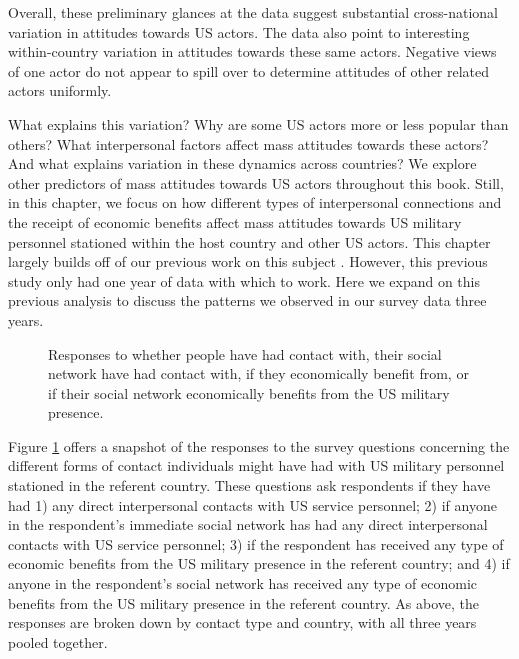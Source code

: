 Overall, these preliminary glances at the data suggest substantial cross-national variation in attitudes towards US actors. The data also point to interesting within-country variation in attitudes towards these same actors. Negative views of one actor do not appear to spill over to determine attitudes of other related actors uniformly. 


What explains this variation? Why are some US actors more or less popular than others? What interpersonal factors affect mass attitudes towards these actors? And what explains variation in these dynamics across countries? We explore other predictors of mass attitudes towards US actors throughout this book. Still, in this chapter, we focus on how different types of interpersonal connections and the receipt of economic benefits affect mass attitudes towards US military personnel stationed within the host country and other US actors. This chapter largely builds off of our previous work on this subject \cite{Allen2020}. However, this previous study only had one year of data with which to work. Here we expand on this previous analysis to discuss the patterns we observed in our survey data three years. 

\begin{figure}[t]
	\hspace*{-0.5cm}\centering{}
	\caption{Responses to whether people have had contact with, their social network have had contact with, if they economically  benefit from, or if their social network economically benefits from the US military presence.}
	\label{fig:ivdesc}
\end{figure} %
\FloatBarrier

Figure \ref{fig:ivdesc} offers a snapshot of the responses to the survey questions concerning the different forms of contact individuals might have had with US military personnel stationed in the referent country. These questions ask respondents if they have had 1) any direct interpersonal contacts with US service personnel; 2) if anyone in the respondent's immediate social network has had any direct interpersonal contacts with US service personnel; 3) if the respondent has received any type of economic  benefits from the US military presence in the referent country; and 4) if anyone in the respondent's social network has received any type of economic benefits from the US military presence in the referent country. As above, the responses are broken down by contact type and country, with all three years pooled together. 

